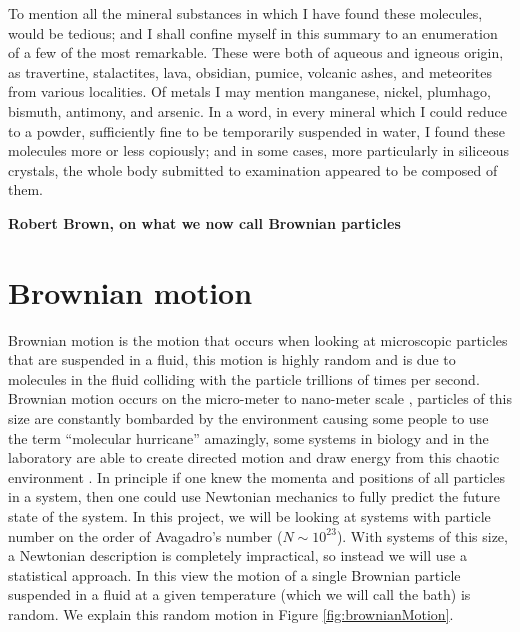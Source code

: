 \epigraph{
To mention all the mineral substances in which I have found these molecules, would be tedious; and I shall confine myself in this summary to an enumeration of a few of the most remarkable. These were both of aqueous and igneous origin, as travertine, stalactites, lava, obsidian, pumice, volcanic ashes, and meteorites from various localities. Of metals I may mention manganese, nickel, plumhago, bismuth, antimony, and arsenic. In a word, in every mineral which I could reduce to a powder, sufficiently fine to be temporarily suspended in water, I found these molecules more or less copiously; and in some cases, more particularly in siliceous crystals, the whole body submitted to examination appeared to be composed of them.}{\textbf{Robert Brown, on what we now call Brownian particles}}

\section{Brownian motion}
Brownian motion is the motion that occurs when looking at microscopic particles that are suspended in a fluid, this motion is highly random and is due to molecules in the fluid colliding with the particle trillions of times per second. Brownian motion occurs on the micro-meter to nano-meter scale \cite{KellerBustamante2000,Reimann2001}, particles of this size are constantly bombarded by the environment causing some people to use the term ``molecular hurricane'' \cite{Astumian2007} amazingly, some systems in biology and in the laboratory are able to create directed motion and draw energy from this chaotic environment \cite{Reimann2001}. In principle if one knew the momenta and positions of all particles in a system, then one could use Newtonian mechanics to fully predict the future state of the system. In this project, we will be looking at systems with particle number on the order of Avagadro's number ($N \sim 10^{23}$). With systems of this size, a Newtonian description is completely impractical, so instead we will use a statistical approach. In this view the motion of a single Brownian particle suspended in a fluid at a given temperature (which we will call the bath) is random. We explain this random motion in Figure \ref{fig:brownianMotion}.


